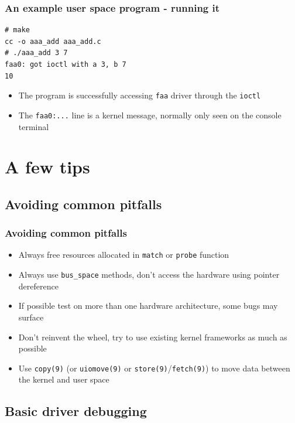 \documentclass[dvipsnames,table]{beamer}
\begin{document}
\begin{frame}[fragile]
\frametitle{An example user space program - running it}
\begin{verbatim}
# make
cc -o aaa_add aaa_add.c
# ./aaa_add 3 7
faa0: got ioctl with a 3, b 7
10
\end{verbatim}
\begin{itemize}
	\item The program is successfully accessing {\tt faa} driver through the {\tt ioctl}
	\item The {\tt faa0:...} line is a kernel message, normally only seen on the console terminal
\end{itemize}
\end{frame}

\section{A few tips}

\subsection{Avoiding common pitfalls}

\begin{frame}
\frametitle{Avoiding common pitfalls}

\begin{itemize}
	\item Always free resources allocated in {\tt match} or {\tt probe} function
	\item Always use {\tt bus\_space} methods, don't access the hardware using pointer dereference
	\item If possible test on more than one hardware architecture, some bugs may surface
	\item Don't reinvent the wheel, try to use existing kernel frameworks as much as possible
	\item Use {\tt copy(9)} (or {\tt uiomove(9)} or {\tt store(9)}/{\tt fetch(9)}) to move data between the kernel and user space 
\end{itemize}
\end{frame}

\subsection{Basic driver debugging}
\end{document}
